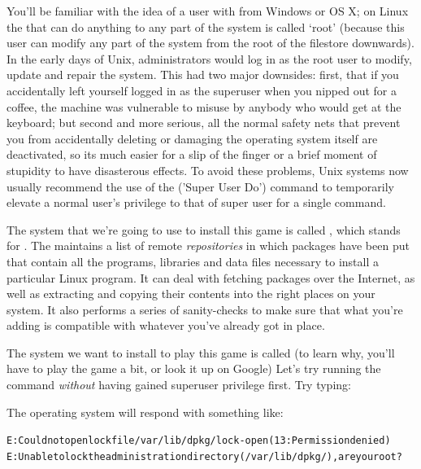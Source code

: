 You'll be familiar with the idea of a user with  from Windows or OS X; on Linux the  that can do anything to any part of the system is called `root' (because this user can modify any part of the system from the root of the filestore downwards). In the early days of Unix, administrators would log in as the root user to modify, update and repair the system. This had two major downsides: first, that if you accidentally left yourself logged in as the superuser when you nipped out for a coffee, the machine was vulnerable to misuse by anybody who would get at the keyboard; but second and more serious, all the normal safety nets that prevent you from accidentally deleting or damaging the operating system itself are deactivated, so its much easier for a slip of the finger or a brief moment of stupidity to have disasterous effects. To avoid these problems, Unix systems now usually recommend the use of the  ('Super User Do') command to temporarily elevate a normal user's privilege to that of super user for a single command. 

The system that we're going to use to install this game is called , which stands for . The  maintains a list of remote \textit{repositories} in which packages have been put that contain all the programs, libraries and data files necessary to install a particular Linux program. It can deal with fetching packages over the Internet, as well as extracting and copying their contents into the right places on your system. It also performs a series of sanity-checks to make sure that what you're adding is compatible with whatever you've already got in place.

The system we want to install to play this game is called  (to learn why, you'll have to play the game a bit, or look it up on Google) Let's try running the  command \textit{without} having gained superuser privilege first. Try typing:


\noindent The operating system will respond with something like:

\begin{alltt}
  \small
E: Could not open lock file /var/lib/dpkg/lock - open (13: Permission denied)
E: Unable to lock the administration directory (/var/lib/dpkg/), are you root?
\end{alltt}

